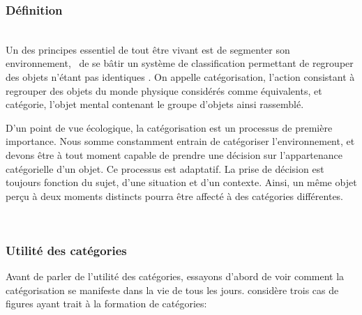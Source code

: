 \subsubsection{Définition}

 \\

Un des principes essentiel de tout être vivant est de segmenter son environnement, \ie~de se bâtir un système de classification permettant de regrouper des objets n'étant pas identiques \citep[p. 1]{rosch1978cognition}. On appelle catégorisation, l'action consistant à regrouper des objets du monde physique considérés comme équivalents, et catégorie, l'objet mental contenant le groupe d'objets ainsi rassemblé. 
 
D'un point de vue écologique, la catégorisation est un processus de première importance. Nous somme constamment entrain de catégoriser l'environnement, et devons être à tout moment capable de prendre une décision sur l'appartenance catégorielle d'un objet. Ce processus est adaptatif. La prise de décision est toujours fonction du sujet, d'une situation et d'un contexte. Ainsi, un même objet perçu à deux moments distincts pourra être affecté à des catégories différentes.

 \\

\subsubsection{Utilité des catégories}

Avant de parler de l'utilité des catégories, essayons d'abord de voir comment la catégorisation se manifeste dans la vie de tous les jours.  \citep{anderson1991adaptive} considère trois cas de figures ayant trait à la formation de catégories:  \\


